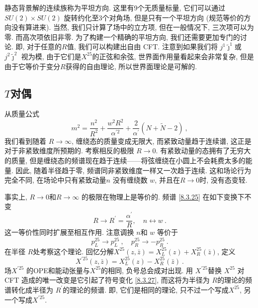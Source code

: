 静态背景解的连续族称为平坦方向. 这里有9个无质量标量, 它们可以通过 $S U(2) \times S U(2)$ 旋转约化至3个对角场, 但是只有一个平坦方向 (规范等价的方向没有算进来). 当然, 我们只计算了场中的立方项, 但在一般情况下, 三次项可以为零. 而高次项依旧非零. 为了构建一个精确的平坦方向, 我们还需要更加专门的讨论. 
即, 对于任意的$R$值, 我们可以构建出自由 CFT. 注意到如果我们将 $j^{1} \tilde{\jmath}^{1}$或 $j^{2} \tilde{\jmath}^{2}$ 视为模, 
由于它们是$X^{25}$的正弦和余弦, 世界面作用量看起来会非常复杂, 但是由于它等价于变分$R$获得的自由理论, 所以世界面理论是可解的.

\subsection*{$T$对偶}
从质量公式
\begin{equation}
	m^{2}=\frac{n^{2}}{R^{2}}+\frac{w^{2} R^{2}}{\alpha^{\prime 2}}+\frac{2}{\alpha^{\prime}}(N+\tilde{N}-2) \:, \label{8.3.25}
\end{equation}
我们看到随着 $R \rightarrow \infty$, 缠绕态的质量变成无限大, 而紧致动量趋于连续谱, 这正是对于非紧致维度所预期的. 考察相反的极限 $R \rightarrow 0$. 
有紧致动量的态拥有了无穷大的质量, 但是缠绕态的频谱现在趋于连续——将弦缠绕在小圆上不会耗费太多的能量. 因此, 随着半径趋于零, 频谱同非紧致维度一样又一次趋于连续. 
这和场论行为完全不同, 在场论中只有紧致动量$n$ 没有缠绕数 $w$, 并且在$R \rightarrow 0$时, 没有态变轻.

事实上,  $R \rightarrow 0$和$R \rightarrow \infty$ 的极限在物理上是等价的. 频谱 \eqref{8.3.25} 在如下变换下不变
\begin{equation}
	R \rightarrow R^{\prime}=\frac{\alpha^{\prime}}{R}, \quad n \leftrightarrow w \:. \label{8.3.26}
\end{equation}
这一等价性同时扩展至相互作用. 注意调换 $n$和 $w$ 等价于
\begin{equation}
	p_{L}^{25} \rightarrow p_{L}^{25}\:, \quad p_{R}^{25} \rightarrow-p_{R}^{25} \:. \label{8.3.27}
\end{equation}
在半径 $R$处考察这个理论. 回忆分解$X^{25}(z, \bar{z})=X_{L}^{25}(z)+X_{R}^{25}(\bar{z})$, 定义
\begin{equation}
	X^{\prime 25}(z, \bar{z})=X_{L}^{25}(z)-X_{R}^{25}(\bar{z}) \:. \label{8.3.28}
\end{equation}
场$X^{\prime 25}$ 的OPE和能动张量与$X^{25}$的相同, 负号总会成对出现. 用 $X^{\prime 25}$替换 $X^{25}$ 对 CFT 造成的唯一改变是它引起了符号变化
\eqref{8.3.27}, 而这将为半径为 $R$的理论的频谱转化成半径为 $R^{\prime}$的理论的频谱. 即, 它们是相同的理论, 只不过一个写成$X^{25}$, 
另一个写成$X^{\prime 25} $.

